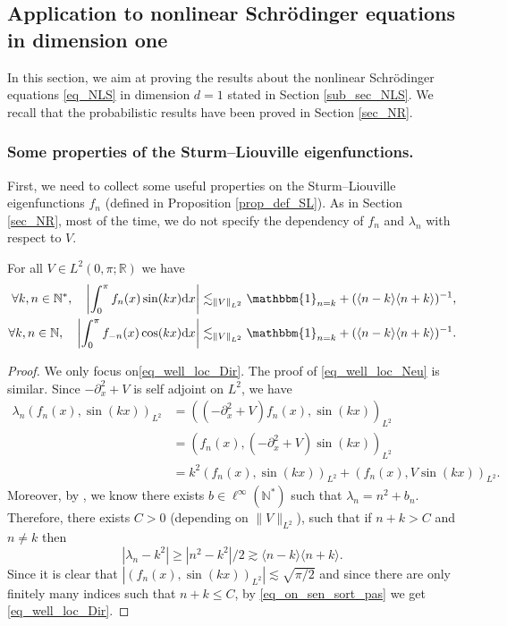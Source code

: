 \subsection{Application to nonlinear Schrödinger equations in dimension one}
\label{sec_NLS}
In this section, we aim at proving the results about the nonlinear Schrödinger equations \eqref{eq_NLS} in dimension $d=1$ stated in Section \ref{sub_sec_NLS}. We recall that the probabilistic results have been proved in Section \ref{sec_NR}.

\subsubsection{Some properties of the Sturm--Liouville eigenfunctions.}
First, we need to collect some useful properties on the Sturm--Liouville eigenfunctions $f_n$ (defined in Proposition \ref{prop_def_SL}). As in Section \ref{sec_NR}, most of the time, we do not specify the dependency of $f_n$ and $\lambda_n$ with respect to $V$.
\begin{lemma} \label{lem_well_loc} For all $V\in L^2(0,\pi;\mathbb{R})$ we have
\begin{align}
\label{eq_well_loc_Dir}
\forall k,n \in \mathbb{N}^*, \quad \biggl| \int_0^\pi f_n(x) \sin(k x) \mathrm{d}x \biggr| \lesssim_{\|V\|_{L^2}} \mathbbm{1}_{n=k} + (\langle n - k \rangle \langle n + k \rangle)^{-1},
\\
\label{eq_well_loc_Neu}
\forall k,n \in \mathbb{N}, \quad \biggl| \int_0^\pi f_{-n}(x) \cos(k x) \mathrm{d}x \biggr| \lesssim_{\|V\|_{L^2}} \mathbbm{1}_{n=k} + (\langle n - k \rangle \langle n + k \rangle)^{-1}.
\end{align}
\end{lemma}
\begin{proof} We only focus on\eqref{eq_well_loc_Dir}. The proof of \eqref{eq_well_loc_Neu} is similar. Since $-\partial_x^2 + V$ is self adjoint on $L^2$, we have
\begin{equation}
\label{eq_on_sen_sort_pas}
\begin{split}
\lambda_n (f_n(x),\sin(k x))_{L^2} &= ((-\partial_x^2 + V) f_n(x),\sin(k x))_{L^2}\\
& = (f_n(x),(-\partial_x^2 + V) \sin(k x))_{L^2} \\
&= k^2 (f_n(x),\sin(k x))_{L^2} + (f_n(x),V \sin(k x))_{L^2}.
\end{split}
\end{equation}
Moreover, by \cite[Th.\,4 p.\,35]{PT}, we know there exists $b \in \ell^{\infty}(\mathbb{N}^*)$ such that
$\lambda_n = n^2 + b_n$.
Therefore, there exists $C>0$ (depending on $\|V\|_{L^2}$), such that if $n+k>C$ and $n\neq k$ then
\[
|\lambda_n - k^2| \geq |n^2 - k^2|/2 \gtrsim \langle n - k \rangle \langle n + k \rangle.
\]
Since it is clear that $|(f_n(x),\sin(k x))_{L^2} |\lesssim \sqrt{\pi/2}$ and since there are only finitely many indices such that $n+k\leq C$, by \eqref{eq_on_sen_sort_pas} we get \eqref{eq_well_loc_Dir}.
\end{proof}

